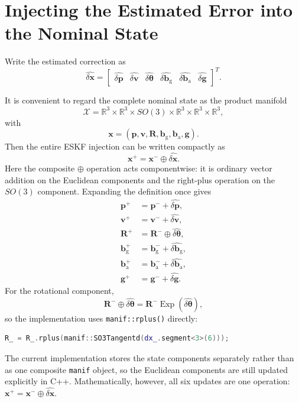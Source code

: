 \documentclass[11pt]{article}
\newcommand{\R}{\mathbf{R}}
\newcommand{\p}{\mathbf{p}}
\newcommand{\vct}{\mathbf{v}}
\newcommand{\bg}{\mathbf{b}_{\mathrm{g}}}
\newcommand{\ba}{\mathbf{b}_{\mathrm{a}}}
\newcommand{\g}{\mathbf{g}}
\newcommand{\Exp}{\operatorname{Exp}}
\begin{document}
\section{Injecting the Estimated Error into the Nominal State}
Write the estimated correction as
\begin{equation}
\widehat{\delta\bm x}
=
\begin{bmatrix}
\widehat{\delta\p} &
\widehat{\delta\vct} &
\widehat{\delta\bm\theta} &
\widehat{\delta\bg} &
\widehat{\delta\ba} &
\widehat{\delta\g}
\end{bmatrix}^{T}.
\end{equation}

It is convenient to regard the complete nominal state as the product manifold
\begin{equation}
\mathcal X
=
\mathbb R^3\times\mathbb R^3\times SO(3)\times
\mathbb R^3\times\mathbb R^3\times\mathbb R^3,
\end{equation}
with
\begin{equation}
\bm x=(\p,\vct,\R,\bg,\ba,\g).
\end{equation}
Then the entire ESKF injection can be written compactly as
\begin{equation}
\boxed{
\bm x^{+}
=
\bm x^{-}\oplus\widehat{\delta\bm x}.
}
\end{equation}
Here the composite $\oplus$ operation acts componentwise: it is ordinary vector addition on the Euclidean components and the right-plus operation on the $SO(3)$ component.  Expanding the definition once gives
\begin{align}
\p^{+} &= \p^{-}+\widehat{\delta\p},\\
\vct^{+} &= \vct^{-}+\widehat{\delta\vct},\\
\R^{+} &= \R^{-}\oplus\widehat{\delta\bm\theta},\\
\bg^{+} &= \bg^{-}+\widehat{\delta\bg},\\
\ba^{+} &= \ba^{-}+\widehat{\delta\ba},\\
\g^{+} &= \g^{-}+\widehat{\delta\g}.
\end{align}
For the rotational component,
\begin{equation}
\R^{-}\oplus\widehat{\delta\bm\theta}
=
\R^{-}\Exp(\widehat{\delta\bm\theta}),
\end{equation}
so the implementation uses \texttt{manif::rplus()} directly:
\begin{lstlisting}[language=C++,basicstyle=\ttfamily\small]
R_ = R_.rplus(manif::SO3Tangentd(dx_.segment<3>(6)));
\end{lstlisting}
The current implementation stores the state components separately rather than as one composite \texttt{manif} object, so the Euclidean components are still updated explicitly in C++.  Mathematically, however, all six updates are one operation: $\bm x^{+}=\bm x^{-}\oplus\widehat{\delta\bm x}$.
\end{document}
